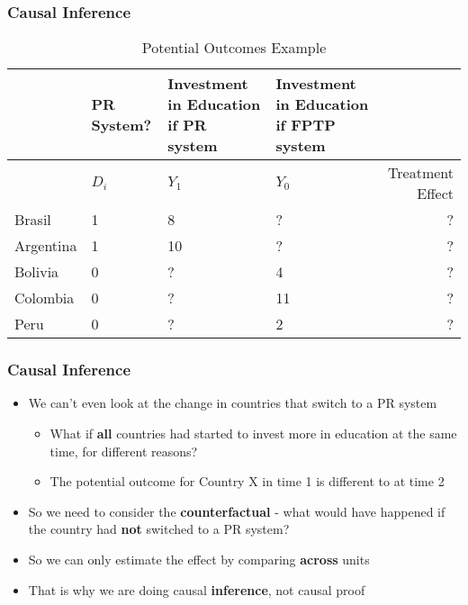 \documentclass[xcolor=x11names,compress]{beamer}\usepackage[]{graphicx}\usepackage[]{color}
\renewcommand{\(}{\begin{columns}}
\renewcommand{\)}{\end{columns}}
\newcommand{\<}[1]{\begin{column}{#1}}
\renewcommand{\>}{\end{column}}
\begin{document}
\begin{frame}
\frametitle{Causal Inference}
\footnotesize
\begin{table}[htbp]
  \centering
  \caption{Potential Outcomes Example}
    \begin{tabular}{|p{1.8cm}|p{2.2cm}|p{2.2cm}|p{1.8cm}|r|}
    \hline
          & \multicolumn{1}{p{1.8cm}|}{PR System?} & \multicolumn{1}{p{2.2cm}|}{Investment in Education if PR system} & \multicolumn{1}{p{2.2cm}|}{Investment in Education if FPTP system} &  \bigstrut\\
    \hline
          & \multicolumn{1}{p{1.8cm}|}{$D_i$} & \multicolumn{1}{p{2.2cm}|}{$Y_1$} & \multicolumn{1}{p{2.2cm}|}{$Y_0$} & \multicolumn{1}{p{1.8cm}|}{Treatment Effect} \bigstrut\\
    \hline
    Brasil & 1 & 8     & ?      & ? \bigstrut\\
    \hline
    Argentina & 1 & 10    & ?      & ? \bigstrut\\
    \hline
    Bolivia & 0 & ?     & 4     & ? \bigstrut\\
    \hline
    Colombia & 0 &  ?   & 11    & ? \bigstrut\\
    \hline
    Peru & 0 & ?     & 2     & ? \bigstrut\\
    \hline
    \end{tabular}%
  \label{tab:addlabel}%
\end{table}%
\normalsize
\end{frame}

\begin{frame}
\frametitle{Causal Inference}
\begin{itemize}
\item We can't even look at the change in countries that switch to a PR system
\begin{itemize}
\item What if \textbf{all} countries had started to invest more in education at the same time, for different reasons?
\item The potential outcome for Country X in time 1 is different to at time 2
\end{itemize}
\item So we need to consider the \textbf{counterfactual} - what would have happened if the country had \textbf{not} switched to a PR system?
\item So we can only estimate the effect by comparing \textbf{across} units
\item That is why we are doing causal \textbf{inference}, not causal proof
\end{itemize}
\end{frame}
\end{document}
